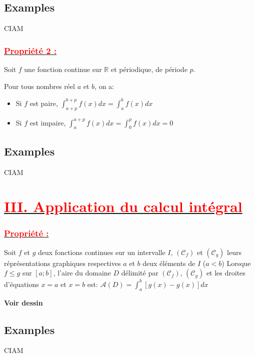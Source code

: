 \documentclass[12pt,a4paper]{article}
\begin{document}
\subsection*{Examples}
CIAM
\subsubsection*{\underline{\textcolor{red}{Propriété 2 :}}}
Soit \(f\) une fonction continue sur \( \mathbb{R} \) et périodique, de période \(p\).

Pour tous nombres réel \(a\) et \(b\), on a:

\begin{itemize}
    \item Si \(f\) est paire, \( \int_{a+p}^{b+p}f(x)dx = \int_{a}^{b}f(x)dx \)
    \item Si \(f\) est impaire, \( \int_{a}^{a+p}f(x)dx =  \int_{0}^{p}f(x)dx = 0 \)
\end{itemize}
\subsection*{Examples}
CIAM
\section*{\underline{\textbf{\textcolor{red}{III. Application du calcul intégral}}}}
\subsubsection*{\underline{\textcolor{red}{Propriété :}}}
Soit \(f\) et \(g\) deux fonctions continues sur un intervalle \(I\), \( (\mathcal{C}_f) \) et \( (\mathcal{C}_g) \) leurs réprésentations graphiques respectives \(a\) et \(b\) deux éléments de \(I\) (\(a<b\))
Lorsque \(f \leq g\) sur \( [a;b] \), l'aire du domaine \(D\) délimité par \( (\mathcal{C}_f) \), \( (\mathcal{C}_g) \) et les droites d'équations \( x=a \) et \( x=b \) est: \(\mathcal{A}(D)=\int_{a}^{b} [g(x)-g(x)]dx \)

\textbf{Voir dessin}
\subsection*{Examples}
CIAM
\end{document}
